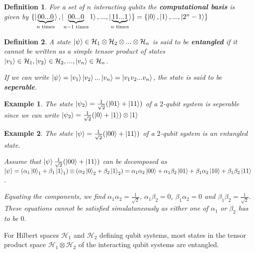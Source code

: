 \documentclass[12pt,twoside,fleqn]{report}
\theoremstyle{thmstyle}
\newtheorem{defn}{Definition}[chapter]
\newtheorem{eg}{Example}[chapter]
\begin{document}
\begin{defn}

    For a set of $n$ interacting qubits the \textbf{computational basis} is given by $\{ \ket{\underbrace{00...0}_{n \text{ times}}}, \ket{\underbrace{00...0}_{n-1 \text{ times}}1}, ... ,\ket{\underbrace{11...1}_{n \text{ times}}} \} = \{ \ket{0}, \ket{1}, ... , \ket{2^n - 1} \}$
\end{defn}




\begin{defn}
    A state $\ket{\psi} \in \mathcal{H}_1 \otimes \mathcal{H}_2 \otimes ... \otimes \mathcal{H}_n$ is said to be \textbf{entangled} if it cannot be written as a simple tensor product of states $\ket{v_1} \in \mathcal{H}_1, \ket{v_2} \in \mathcal{H}_2, ..., \ket{v_n} \in \mathcal{H}_n$. 

    If we can write $\ket{\psi} = \ket{v_1}\ket{v_2}...\ket{v_n} = \ket{v_1 v_2...v_n}$, the state is said to be \textbf{seperable}.
\end{defn}

\begin{eg}
The state $\ket{\psi_2} = \frac{1}{\sqrt{2}} (\ket{01} + \ket{11})$ of a $2$-qubit system is seperable since we can write $\ket{\psi_2} = \frac{1}{\sqrt{2}} (\ket{0} + \ket{1}) \otimes \ket{1}$
\end{eg}


\begin{eg}
The state $\ket{\psi} = \frac{1}{\sqrt{2}} (\ket{00} + \ket{11})$ of a $2$-qubit system is an entangled state.

    Assume that  $\ket{\psi} \frac{1}{\sqrt{2}} (\ket{00} + \ket{11}) $ can be decomposed as $\ket{\psi} = (\alpha_1 \ket{0}_1 + \beta_1 \ket{1}_1) \otimes (\alpha_2 \ket{0}_2 + \beta_2 \ket{1}_2) = \alpha_1 \alpha_2 \ket{00} + \alpha_1 \beta_2 \ket{01} + \beta_1 \alpha_2 \ket{10} + \beta_1 \beta_2 \ket{11}$.

    Equating the components, we find $\alpha_1 \alpha_2 = \displaystyle\frac{1}{\sqrt{2}}$, $\alpha_1 \beta_2 = 0$, $\beta_1 \alpha_2 = 0$ and $\beta_1 \beta_2 = \displaystyle\frac{1}{\sqrt{2}}$. These equations cannot be satisfied simulataneously as either one of $\alpha_1$ or $\beta_2$ has to be $0$.
\end{eg}


For Hilbert spaces $\mathcal{H}_1$ and $\mathcal{H}_2$ defining qubit systems, most states in the tensor product space $\mathcal{H}_1 \otimes \mathcal{H}_2$ of the interacting qubit systems are entangled.
\end{document}
